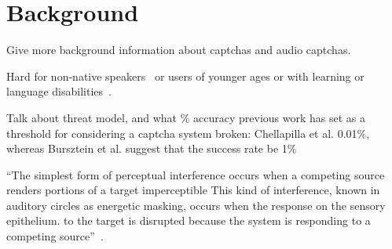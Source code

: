\section{Background}
\label{sec:background}

Give more background information about captchas and audio captchas.

Hard for non-native speakers~\cite{yan2008usability} or users of 
younger ages or with learning or language disabilities~\cite{schlaikjer2007dual}.

Talk about threat model, and what \% accuracy previous work has
set as a threshold for considering a captcha system broken:
Chellapilla et al. \cite{Chellapilla} 0.01\%,
whereas Bursztein et al. \cite{bursztein2011failure} suggest that
the success rate be 1\%

``The simplest form of perceptual interference occurs when a competing source renders portions of a target imperceptible
This kind of interference, known in auditory circles as energetic masking, occurs when the response on the sensory epithelium.
to the target is disrupted because the system is responding to a competing source''~\cite{shinn2008object}.
